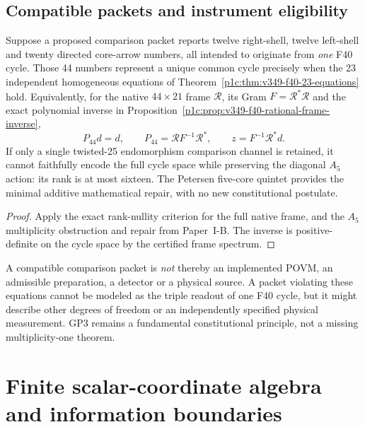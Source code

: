 \documentclass[12pt,a4paper]{article}
\begin{document}
\subsection{Compatible packets and instrument eligibility}
\label{p2:sec:v349-f40-compatible-packets}
\begin{proposition}
\label{p2:prop:v349-f40-readout-compatibility}
Suppose a proposed comparison packet reports twelve right-shell,
twelve left-shell and twenty directed core-arrow numbers, all
intended to originate from \emph{one} F40 cycle.  Those 44
numbers represent a unique common cycle precisely when the
23 independent homogeneous equations of
Theorem~\ref{p1c:thm:v349-f40-23-equations} hold.  Equivalently,
for the native $44\times21$ frame $\mathcal R$, its Gram
$F=\mathcal R^*\mathcal R$ and the exact polynomial inverse
in Proposition~\ref{p1c:prop:v349-f40-rational-frame-inverse},
\[
 P_{44}d=d,\qquad P_{44}=\mathcal R F^{-1}\mathcal R^*,
 \qquad z=F^{-1}\mathcal R^*d.
\]
If only a single twisted-25 endomorphism comparison channel
is retained, it cannot faithfully encode the full cycle space
while preserving the diagonal $A_5$ action: its rank is at most
sixteen.  The Petersen five-core quintet provides the minimal
additive mathematical repair, with no new constitutional
postulate.
\end{proposition}
\begin{proof}
Apply the exact rank-nullity criterion for the full native
frame, and the $A_5$ multiplicity obstruction and repair from
Paper~I-B.  The inverse is positive-definite on the cycle
space by the certified frame spectrum.
\end{proof}
\begin{remark}
\label{p2:rem:v349-f40-detector-guard}
A compatible comparison packet is \emph{not} thereby an
implemented POVM, an admissible preparation, a detector or a
physical source.  A packet violating these equations cannot
be modeled as the triple readout of one F40 cycle, but it might
describe other degrees of freedom or an independently specified
physical measurement.  GP3 remains a fundamental constitutional
principle, not a missing multiplicity-one theorem.
\end{remark}


\section{Finite scalar-coordinate algebra and information boundaries}
\label{p2c:sec:v3067-scalar-toeplitz-occurrence}
\end{document}
